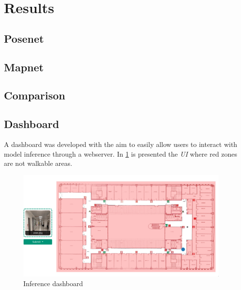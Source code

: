 \section{Results}
\subsection{Posenet}
\subsection{Mapnet}
\subsection{Comparison}
\subsection{Dashboard}
A dashboard was developed with the aim to easily allow users to interact with model inference through a webserver. In \cref{fig:dashboard} is presented the \textit{UI} where red zones are not walkable areas.
\begin{figure}
    \begin{center}
        \includegraphics[width=0.95\textwidth]{./imgs/dashboard.png}
    \end{center}
    \caption{Inference dashboard}
    \label{fig:dashboard}
\end{figure}




